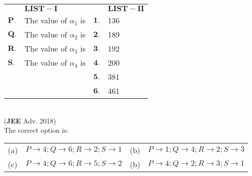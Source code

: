 \documentclass[journal,12pt,twocolumn]{IEEEtran}
\theoremstyle{remark}
\begin{document}
\begin{tabular}{p{1cm}p{9cm}p{1cm}p{4cm}}
     &  $\mathbf{LIST-I}$ & & $\mathbf{LIST-II}$\\
    $\mathbf{P.}$  & The value of $\alpha_1$ is & $\mathbf{1.}$ & 136\\
    $\mathbf{Q.}$ & The value of $\alpha_2$ is & $\mathbf{2.}$&189\\
    $\mathbf{R.}$ & The value of $\alpha_3$ is & $\mathbf{3.}$&192\\
    $\mathbf{S.}$ & The value of $\alpha_4$ is & $\mathbf{4.}$&200\\
    & & $\mathbf{5.}$&381\\
    & & $\mathbf{6.}$&461\\
    
\end{tabular}\\

\hfill(\textbf{JEE}  Adv. 2018)\\
The correct option is:\\ 
\begin{tabular}{p{0.5cm}p{10cm}p{0.5cm}p{6cm}}
    (a) & $P \to4; Q\to6; R\to2; S\to 1$ & (b) & $P \to1; Q\to4; R\to2; S\to 3$ \\
     (c)& $P \to4; Q\to6; R\to5; S\to 2$ & (b) & $P \to4; Q\to2; R\to3; S\to 1$ 
\end{tabular}\\
\end{document}
